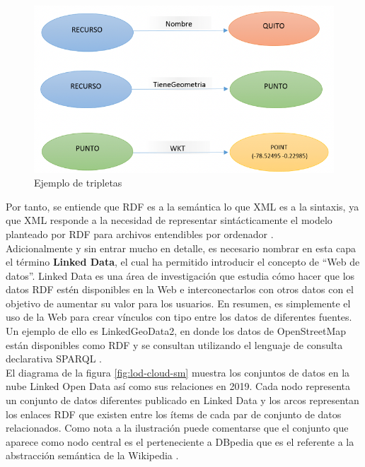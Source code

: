 \begin{figure}[H]
	\centering
	\includegraphics[width=0.8\linewidth]{imagenes/capitulo3/Imagen1}
	\caption{Ejemplo de tripletas \cite{coursera}}
	\label{fig:imagen1}
\end{figure}



Por tanto, se entiende que RDF es a la semántica lo que XML es a la sintaxis, ya que XML responde a la necesidad de representar sintácticamente el modelo planteado por RDF para archivos entendibles por ordenador \cite{web-semantica-w3c}.\\

Adicionalmente y sin entrar mucho en detalle, es necesario nombrar en esta capa el término \textbf{Linked Data}, el cual ha permitido introducir el concepto de ``Web de datos''. Linked Data es una área de investigación que estudia cómo hacer que los datos RDF estén disponibles en la Web e interconectarlos con otros datos con el objetivo de aumentar su valor para los usuarios. En resumen, es simplemente el uso de la Web para crear vínculos con tipo entre los datos de diferentes fuentes. Un ejemplo de ello es LinkedGeoData2, en donde los datos de OpenStreetMap están disponibles como RDF y se consultan utilizando el lenguaje de consulta declarativa SPARQL \cite{wkt-database, aplicacion}.\\

El diagrama de la figura \ref{fig:lod-cloud-sm} muestra los conjuntos de datos en la nube Linked Open Data así como sus relaciones en 2019. Cada nodo representa un conjunto de datos diferentes publicado en Linked Data y los arcos representan los enlaces RDF que existen entre los ítems de cada par de conjunto de datos relacionados. Como nota a la ilustración puede comentarse que el conjunto que aparece como nodo central es el perteneciente a DBpedia que es el referente a la abstracción semántica de la Wikipedia \cite{aplicacion}.

